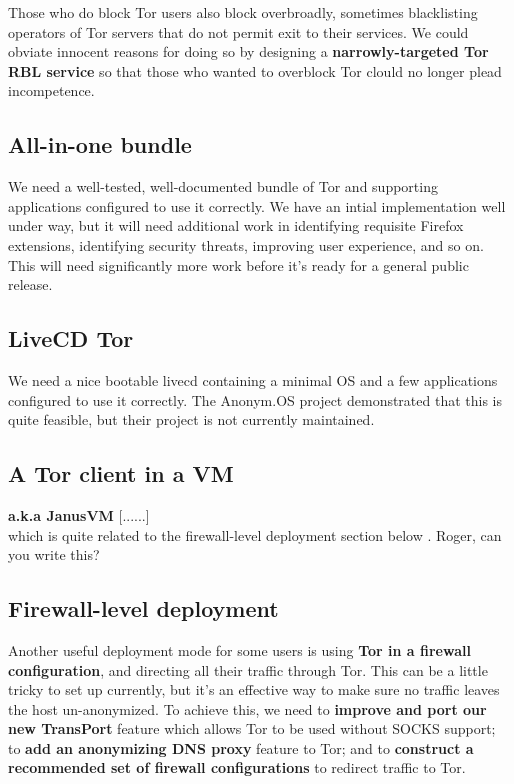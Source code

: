 \documentclass{article}
\newcommand{\tmp}[1]{{\bf #1} [......] \\}
\begin{document}
Those who do block Tor users also block overbroadly, sometimes blacklisting
operators of Tor servers that do not permit exit to their services.  We could
obviate innocent reasons for doing so by designing a {\bf narrowly-targeted Tor
  RBL service} so that those who wanted to overblock Tor clould no longer
plead incompetence.

\subsection{All-in-one bundle}
We need a well-tested, well-documented bundle of Tor and supporting
applications configured to use it correctly.  We have an intial
implementation well under way, but it will need additional work in
identifying requisite Firefox extensions, identifying security threats,
improving user experience, and so on.  This will need significantly more work
before it's ready for a general public release.

\subsection{LiveCD Tor}
We need a nice bootable livecd containing a minimal OS and a few applications
configured to use it correctly.  The Anonym.OS project demonstrated that this
is quite feasible, but their project is not currently maintained.

\subsection{A Tor client in a VM}
\tmp{a.k.a JanusVM} which is quite related to the firewall-level deployment
section below .  Roger, can you write this?


\subsection{Firewall-level deployment}
Another useful deployment mode for some users is using {\bf Tor in a firewall
  configuration}, and directing all their traffic through Tor.  This can be a
little tricky to set up currently, but it's an effective way to make sure no
traffic leaves the host un-anonymized.  To achieve this, we need to {\bf
  improve and port our new TransPort} feature which allows Tor to be used
without SOCKS support; to {\bf add an anonymizing DNS proxy} feature to Tor;
and to {\bf construct a recommended set of firewall configurations} to redirect
traffic to Tor.
\end{document}

